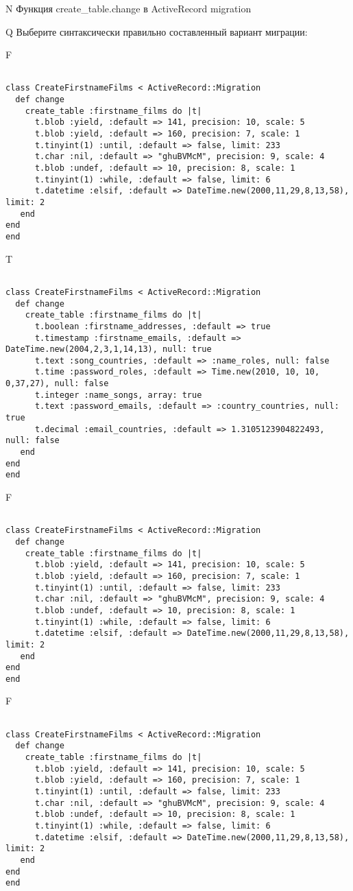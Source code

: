 N
Функция create_table.change в ActiveRecord migration

Q
Выберите синтаксически правильно составленный вариант миграции:

F
\begin{verbatim}
		
class CreateFirstnameFilms < ActiveRecord::Migration 
  def change 
    create_table :firstname_films do |t| 
      t.blob :yield, :default => 141, precision: 10, scale: 5
      t.blob :yield, :default => 160, precision: 7, scale: 1
      t.tinyint(1) :until, :default => false, limit: 233
      t.char :nil, :default => "ghuBVMcM", precision: 9, scale: 4
      t.blob :undef, :default => 10, precision: 8, scale: 1
      t.tinyint(1) :while, :default => false, limit: 6
      t.datetime :elsif, :default => DateTime.new(2000,11,29,8,13,58), limit: 2
   end
end
end
\end{verbatim}

T
\begin{verbatim}
		
class CreateFirstnameFilms < ActiveRecord::Migration 
  def change 
    create_table :firstname_films do |t| 
      t.boolean :firstname_addresses, :default => true
      t.timestamp :firstname_emails, :default => DateTime.new(2004,2,3,1,14,13), null: true
      t.text :song_countries, :default => :name_roles, null: false
      t.time :password_roles, :default => Time.new(2010, 10, 10, 0,37,27), null: false
      t.integer :name_songs, array: true
      t.text :password_emails, :default => :country_countries, null: true
      t.decimal :email_countries, :default => 1.3105123904822493, null: false
   end
end
end
\end{verbatim}

F
\begin{verbatim}
		
class CreateFirstnameFilms < ActiveRecord::Migration 
  def change 
    create_table :firstname_films do |t| 
      t.blob :yield, :default => 141, precision: 10, scale: 5
      t.blob :yield, :default => 160, precision: 7, scale: 1
      t.tinyint(1) :until, :default => false, limit: 233
      t.char :nil, :default => "ghuBVMcM", precision: 9, scale: 4
      t.blob :undef, :default => 10, precision: 8, scale: 1
      t.tinyint(1) :while, :default => false, limit: 6
      t.datetime :elsif, :default => DateTime.new(2000,11,29,8,13,58), limit: 2
   end
end
end
\end{verbatim}

F
\begin{verbatim}
		
class CreateFirstnameFilms < ActiveRecord::Migration 
  def change 
    create_table :firstname_films do |t| 
      t.blob :yield, :default => 141, precision: 10, scale: 5
      t.blob :yield, :default => 160, precision: 7, scale: 1
      t.tinyint(1) :until, :default => false, limit: 233
      t.char :nil, :default => "ghuBVMcM", precision: 9, scale: 4
      t.blob :undef, :default => 10, precision: 8, scale: 1
      t.tinyint(1) :while, :default => false, limit: 6
      t.datetime :elsif, :default => DateTime.new(2000,11,29,8,13,58), limit: 2
   end
end
end
\end{verbatim}

